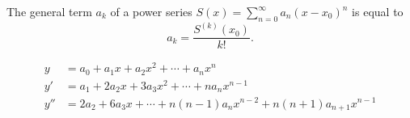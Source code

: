 The general term $a_k$ of a power series $S(x)=\sum_{n=0}^{\infty} a_n(x-x_0)^n$ is equal to
\[
	a_k = \frac{S^{(k)}(x_0)}{k!}
	.\]

\begin{align*}
    y &= a_0+a_1x+a_2x^2+\cdots+a_nx^n\\
    y' &= a_1+2a_2x+3a_3x^2+\cdots+na_nx^{n-1}\\
    y'' &= 2a_2+6a_3x+\cdots+n(n-1)a_nx^{n-2}+n(n+1)a_{n+1}x^{n-1}\\
\end{align*}
